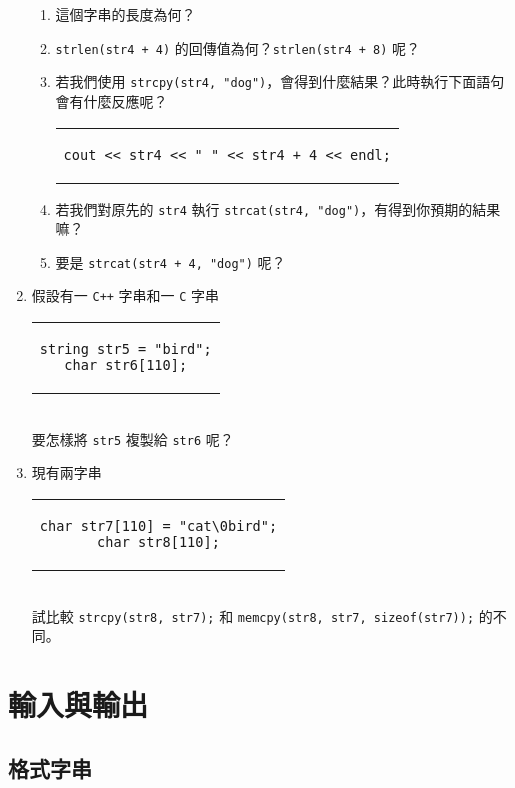 \documentclass[12pt,a4paper,oneside]{report}
\begin{document}
\begin{CJK}{UTF8}{bkai}
\begin{enumerate}
\begin{enumerate}
  \item 這個字串的長度為何？
  \item \lstinline!strlen(str4 + 4)! 的回傳值為何？\lstinline!strlen(str4 + 8)! 呢？
  \item 若我們使用 \lstinline!strcpy(str4, "dog")!，會得到什麼結果？此時執行下面語句會有什麼反應呢？
  \begin{code}[h!]
    \centering
    \begin{tabular}{c}
    \begin{lstlisting}
cout << str4 << " " << str4 + 4 << endl;
    \end{lstlisting}
    \end{tabular}
  \end{code}
  \item 若我們對原先的 \lstinline!str4! 執行 \lstinline!strcat(str4, "dog")!，有得到你預期的結果嘛？
  \item 要是 \lstinline!strcat(str4 + 4, "dog")! 呢？
  \end{enumerate}
\item 假設有一 \texttt{C++} 字串和一 \texttt{C} 字串
\begin{code}[h!]
  \centering
  \begin{tabular}{c}
  \begin{lstlisting}
string str5 = "bird";
char str6[110];
  \end{lstlisting}
  \end{tabular}
\end{code}
\\要怎樣將 \lstinline!str5! 複製給 \lstinline!str6! 呢？
\item 現有兩字串
\begin{code}[h!]
  \centering
  \begin{tabular}{c}
  \begin{lstlisting}
char str7[110] = "cat\0bird";
char str8[110];
  \end{lstlisting}
  \end{tabular}
\end{code}
\\試比較 \lstinline!strcpy(str8, str7);! 和 \lstinline!memcpy(str8, str7, sizeof(str7));! 的不同。
\end{enumerate}

\section{輸入與輸出}
\subsection{格式字串}


\end{CJK}
\end{document}
